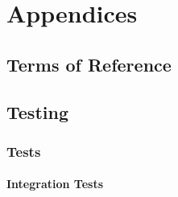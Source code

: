\part{Appendices}
	\chapter{Terms of Reference}
	
	\begin{landscape}
	\chapter{Testing}
	\label{testingappendices}
		\section{Tests}
		\label{testing:testlogs}
			\subsection{Integration Tests}

\end{landscape}
